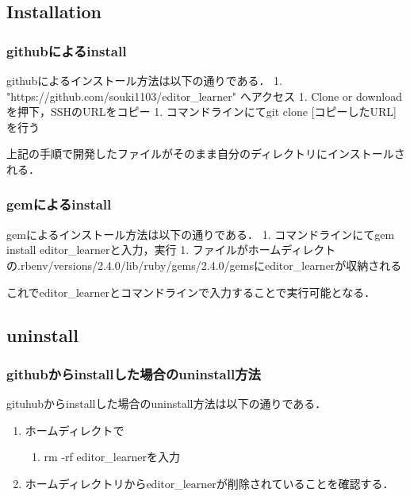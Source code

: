 \documentclass[11pt,dvipdfmx]{jsarticle}
\providecommand{\tightlist}{%
      \setlength{\itemsep}{0pt}\setlength{\parskip}{0pt}}
\begin{document}
    \subsection{Installation}\label{installation}

\subsubsection{githubによるinstall}\label{githubux306bux3088ux308binstall}

githubによるインストール方法は以下の通りである． 1.
"https://github.com/souki1103/editor\_learner" へアクセス 1. Clone or
downloadを押下，SSHのURLをコピー 1. コマンドラインにてgit clone
{[}コピーしたURL{]}を行う

上記の手順で開発したファイルがそのまま自分のディレクトリにインストールされる．

\subsubsection{gemによるinstall}\label{gemux306bux3088ux308binstall}

gemによるインストール方法は以下の通りである． 1. コマンドラインにてgem
install editor\_learnerと入力，実行 1.
ファイルがホームディレクトの.rbenv/versions/2.4.0/lib/ruby/gems/2.4.0/gemsにeditor\_learnerが収納される

これでeditor\_learnerとコマンドラインで入力することで実行可能となる．

    \subsection{uninstall}\label{uninstall}

\subsubsection{githubからinstallした場合のuninstall方法}\label{githubux304bux3089installux3057ux305fux5834ux5408ux306euninstallux65b9ux6cd5}

gituhubからinstallした場合のuninstall方法は以下の通りである．

\begin{enumerate}
\def\labelenumi{\arabic{enumi}.}
\tightlist
\item
  ホームディレクトで

  \begin{enumerate}
  \def\labelenumii{\arabic{enumii}.}
  \setcounter{enumii}{1}
  \tightlist
  \item
    rm -rf editor\_learnerを入力
  \end{enumerate}
\item
  ホームディレクトリからeditor\_learnerが削除されていることを確認する．
\end{enumerate}
\end{document}

